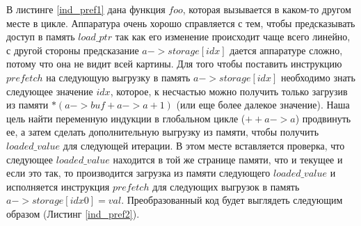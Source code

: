   В листинге \ref{ind_pref1} дана функция $foo$, которая вызывается в каком-то другом месте в цикле. Аппаратура очень хорошо справляется с тем, чтобы предсказывать доступ в память $load\_ptr$ так как его изменение происходит чаще всего линейно, с другой стороны предсказание $a->storage[idx]$ дается аппаратуре сложно, потому что она не видит всей картины. Для того чтобы поставить инструкцию $prefetch$ на следующую выгрузку в память $a->storage[idx]$ необходимо знать следующее значение $idx$, которое, к несчастью можно получить только загрузив из памяти $*(a->buf +a->a +1)$ (или еще более далекое значение). Наша цель найти переменную индукции в глобальном цикле ($++a->a$) продвинуть ее, а затем сделать дополнительную выгрузку из памяти, чтобы получить $loaded\_value$ для следующей итерации. В этом месте вставляется проверка, что следующее $loaded\_value$ находится в той же странице памяти, что и текущее и если это так, то производится загрузка из памяти следующего $loaded\_value$ и исполняется инструкция $prefetch$ для следующих выгрузок в память $a->storage[idx0] = val$. Преобразованный код будет выглядеть следующим образом (Листинг \ref{ind_pref2}).
  
  
